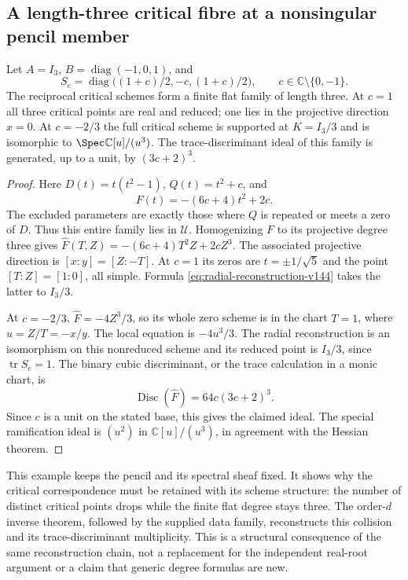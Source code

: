 \subsection{A length-three critical fibre at a nonsingular pencil member}
\begin{proposition}
\label{prop:triple-critical-v144}
Let \(A=I_3\), \(B=\operatorname{diag}(-1,0,1)\), and
\[
 S_c=\operatorname{diag}\bigl((1+c)/2,-c,(1+c)/2\bigr),
       \qquad c\in\mathbb C\setminus\{0,-1\}.
\]
The reciprocal critical schemes form a finite flat family of length
three.  At \(c=1\) all three critical points are real and reduced;
one lies in the projective direction \(x=0\).  At \(c=-2/3\)
the full critical scheme is supported at \(K=I_3/3\) and is
isomorphic to \(\Spec\mathbb C[u]/(u^3)\).  The trace-discriminant
ideal of this family is generated, up to a unit, by
\((3c+2)^3\).
\end{proposition}
\begin{proof}
Here \(D(t)=t(t^2-1)\), \(Q(t)=t^2+c\), and
\begin{equation}\label{eq:triple-score-v144}
                F(t)=-(6c+4)t^2+2c.
\end{equation}
The excluded parameters are exactly those where \(Q\) is repeated
or meets a zero of \(D\).  Thus this entire family lies in
\(\mathscr U\).  Homogenizing \(F\) to its projective degree
three gives
\(\widehat F(T,Z)=-(6c+4)T^2Z+2cZ^3\).
The associated projective direction is \([x:y]=[Z:-T]\).
At \(c=1\) its zeros are \(t=\pm1/\sqrt5\) and the point
\([T:Z]=[1:0]\), all simple.  Formula
\eqref{eq:radial-reconstruction-v144} takes the latter to \(I_3/3\).

At \(c=-2/3\), \(\widehat F=-4Z^3/3\), so its whole
zero scheme is in the chart \(T=1\), where \(u=Z/T=-x/y\).
The local equation is \(-4u^3/3\).  The radial reconstruction is
an isomorphism on this nonreduced scheme and its reduced point is
\(I_3/3\), since \(\operatorname{tr}S_c=1\).
The binary cubic discriminant, or the trace calculation in a monic
chart, is
\begin{equation}\label{eq:triple-discriminant-v144}
                 \operatorname{Disc}(\widehat F)
                       =64c(3c+2)^3.
\end{equation}
Since \(c\) is a unit on the stated base, this gives the claimed
ideal.  The special ramification ideal is \((u^2)\) in
\(\mathbb C[u]/(u^3)\), in agreement with the Hessian theorem.
\end{proof}

This example keeps the pencil and its spectral sheaf fixed.  It shows
why the critical correspondence must be retained with its scheme
structure: the number of distinct critical points drops while the
finite flat degree stays three.  The order-\(d\) inverse theorem,
followed by the supplied data family, reconstructs this collision and
its trace-discriminant multiplicity.  This is a structural consequence
of the same reconstruction chain, not a replacement for the independent
real-root argument or a claim that generic degree formulas are new.
